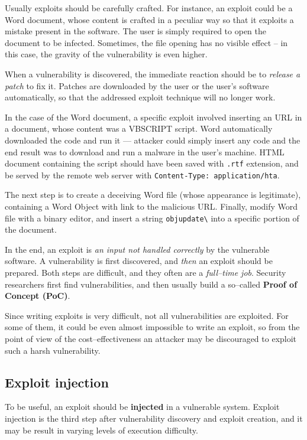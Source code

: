 \documentclass[10pt]{\classname}
\begin{document}
Usually exploits should be carefully crafted. For instance, an exploit could be
a Word document, whose content is crafted in a peculiar way so that it exploits
a mistake present in the software. The user is simply required to open the
document to be infected. Sometimes, the file opening has no visible effect --
in this case, the gravity of the vulnerability is even higher.

When a vulnerability is discovered, the immediate reaction should be to
\emph{release a patch} to fix it. Patches are downloaded by the user or the
user's software automatically, so that the addressed exploit technique will no
longer work.

In the case of the Word document, a specific exploit involved inserting an URL
in a document, whose content was a VBSCRIPT script. Word automatically
downloaded the code and run it --- attacker could simply insert any code and the
end result was to download and run a malware in the user's machine. HTML document
containing the script should have been saved with \texttt{.rtf} extension, and
be served by the remote web server with \texttt{Content-Type: application/hta}.

The next step is to create a deceiving Word file (whose appearance is
legitimate), containing a Word Object with link to the malicious URL. Finally,
modify Word file with a binary editor, and insert a string
\texttt{objupdate\textbackslash} into a specific portion of the document.

In the end, an exploit is \emph{an input not handled correctly} by the
vulnerable software. A vulnerability is first discovered, and \emph{then} an
exploit should be prepared. Both steps are difficult, and they often are a
\emph{full--time job}. Security researchers first find vulnerabilities, and
then usually build a so--called \textbf{Proof of Concept (PoC)}.

Since writing exploits is very difficult, not all vulnerabilities are
exploited. For some of them, it could be even almost impossible to write an
exploit, so from the point of view of the cost--effectiveness an attacker may
be discouraged to exploit such a harsh vulnerability.

\subsection{Exploit injection}

To be useful, an exploit should be \textbf{injected} in a vulnerable system.
Exploit injection is the third step after vulnerability discovery and exploit
creation, and it may be result in varying levels of execution difficulty.
\end{document}

